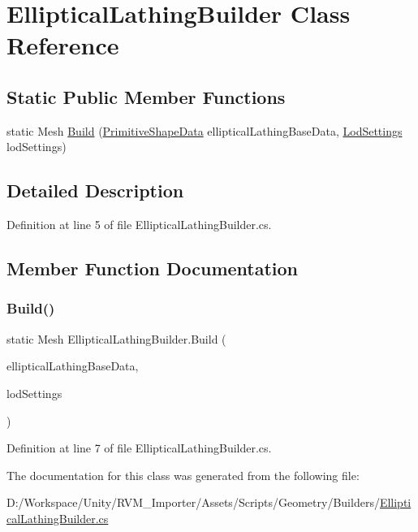 \hypertarget{class_elliptical_lathing_builder}{}\section{Elliptical\+Lathing\+Builder Class Reference}
\label{class_elliptical_lathing_builder}
\subsection*{Static Public Member Functions}
\begin{DoxyCompactItemize}
\item 
static Mesh \mbox{\hyperlink{class_elliptical_lathing_builder_ade06a557cf2f6b9432ff4b8e7bc5a3a5}{Build}} (\mbox{\hyperlink{class_primitive_shape_data}{Primitive\+Shape\+Data}} elliptical\+Lathing\+Base\+Data, \mbox{\hyperlink{class_lod_settings}{Lod\+Settings}} lod\+Settings)
\end{DoxyCompactItemize}


\subsection{Detailed Description}


Definition at line 5 of file Elliptical\+Lathing\+Builder.\+cs.



\subsection{Member Function Documentation}
\mbox{\label{class_elliptical_lathing_builder_ade06a557cf2f6b9432ff4b8e7bc5a3a5}} 
\subsubsection{\texorpdfstring{Build()}{Build()}}
{\footnotesize\ttfamily static Mesh Elliptical\+Lathing\+Builder.\+Build (\begin{DoxyParamCaption}\item[{\mbox{\hyperlink{class_primitive_shape_data}{Primitive\+Shape\+Data}}}]{elliptical\+Lathing\+Base\+Data,  }\item[{\mbox{\hyperlink{class_lod_settings}{Lod\+Settings}}}]{lod\+Settings }\end{DoxyParamCaption})\hspace{0.3cm}{\ttfamily [static]}}



Definition at line 7 of file Elliptical\+Lathing\+Builder.\+cs.



The documentation for this class was generated from the following file\+:\begin{DoxyCompactItemize}
\item 
D\+:/\+Workspace/\+Unity/\+R\+V\+M\+\_\+\+Importer/\+Assets/\+Scripts/\+Geometry/\+Builders/\mbox{\hyperlink{_elliptical_lathing_builder_8cs}{Elliptical\+Lathing\+Builder.\+cs}}\end{DoxyCompactItemize}
